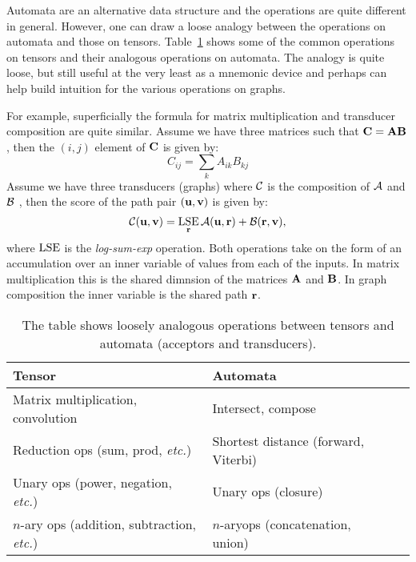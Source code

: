\documentclass[main.tex]{subfiles}
\begin{document}
Automata are an alternative data structure and the operations are quite
different in general. However, one can draw a loose analogy between the
operations on automata and those on tensors.
Table~\ref{tab:tensor_wfst_analogy} shows some of the common operations on
tensors and their analogous operations on automata. The analogy is quite loose,
but still useful at the very least as a mnemonic device and perhaps can help
build intuition for the various operations on graphs.

For example, superficially the formula for matrix multiplication and transducer
composition are quite similar. Assume we have three matrices such that ${\bf C} = {\bf A}
{\bf B}$, then the $(i, j)$ element of ${\bf C}$ is given by:
\begin{equation}
    C_{ij} = \sum_{k} A_{ik} B_{kj}
\end{equation}
Assume we have three transducers (graphs) where $\mathcal{C}$ is the composition of
$\mathcal{A}$ and $\mathcal{B}$ , then the score of the path pair $({\bf u}, {\bf v})$ is given by:
\begin{equation}
    \mathcal{C}({\bf u}, {\bf v}) = \operatorname*{\textrm{LSE}}_{{\bf r}} \mathcal{A}({\bf u}, {\bf r}) + \mathcal{B}({\bf r}, {\bf v}),
\end{equation}
where $\operatorname*{\textrm{LSE}}$ is the \emph{log-sum-exp} operation.
Both operations take on the form of an accumulation over an inner variable of
values from each of the inputs. In matrix multiplication this is the shared
dimnsion of the matrices ${\bf A}$ and ${\bf B}$. In graph composition the inner
variable is the shared path ${\bf r}$.

\begin{table}[ht]
    \renewcommand{\arraystretch}{1.4}
    \caption{The table shows loosely analogous operations between tensors and
    automata (acceptors and transducers).}
    \centering
    \begin{tabular}{l l l}
    \toprule
        Tensor & Automata \\
    \midrule
        Matrix multiplication, convolution & Intersect, compose \\
        \rowcolor{Gray} Reduction ops (sum, prod, \emph{etc.}) & Shortest distance (forward, Viterbi) \\
        Unary ops (power, negation, \emph{etc.})  & Unary ops (closure) \\
        \rowcolor{Gray} $n$-ary ops (addition, subtraction, \emph{etc.})  & $n$-aryops (concatenation, union) \\
    \bottomrule
    \end{tabular}
    \label{tab:tensor_wfst_analogy}
\end{table}
\end{document}
